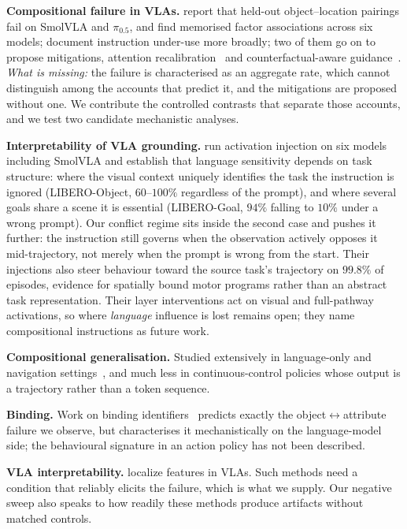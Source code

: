 \documentclass{article}
\begin{document}
\textbf{Compositional failure in VLAs.} \citet{brittle} report that held-out
object--location pairings fail on SmolVLA and $\pi_{0.5}$, and \citet{scaleup} find memorised
factor associations across six models; \citet{better,icbench,liberocf,robosem} document
instruction under-use more broadly; two of them go on to propose mitigations, attention
recalibration~\citep{icbench} and counterfactual-aware guidance~\citep{liberocf}.
\emph{What is missing:} the failure is characterised as an aggregate rate, which cannot
distinguish among the accounts that predict it, and the mitigations are proposed without one.
We contribute the controlled contrasts that separate those accounts, and we test two candidate
mechanistic analyses.

\textbf{Interpretability of VLA grounding.} \citet{notallfeatures} run activation injection
on six models including SmolVLA and establish that language sensitivity depends on task
structure: where the visual context uniquely identifies the task the instruction is ignored
(LIBERO-Object, $60$--$100\%$ regardless of the prompt), and where several goals share a scene
it is essential (LIBERO-Goal, $94\%$ falling to $10\%$ under a wrong prompt). Our conflict
regime sits inside the second case and pushes it further: the instruction still governs when the
observation actively opposes it mid-trajectory, not merely when the prompt is wrong from the
start. Their injections also steer behaviour toward the source task's trajectory on $99.8\%$ of
episodes, evidence for spatially bound motor programs rather than an abstract task
representation. Their layer interventions act on visual and full-pathway activations, so where
\emph{language} influence is lost remains open; they name compositional instructions as future
work.

\textbf{Compositional generalisation.} Studied extensively in language-only and navigation
settings~\citep{scan,gscan}, and much less in continuous-control policies whose output is a
trajectory rather than a token sequence.

\textbf{Binding.} Work on binding identifiers~\citep{bindingids,vlmbinding} predicts exactly
the object$\leftrightarrow$attribute failure we observe, but characterises it mechanistically on
the language-model side; the behavioural signature in an action policy has not been described.

\textbf{VLA interpretability.} \citet{notallfeatures,vlatrace} localize features in VLAs.
Such methods need a condition that reliably elicits the failure, which is what we supply. Our
negative sweep also speaks to how readily these methods produce artifacts without matched
controls.
\end{document}
